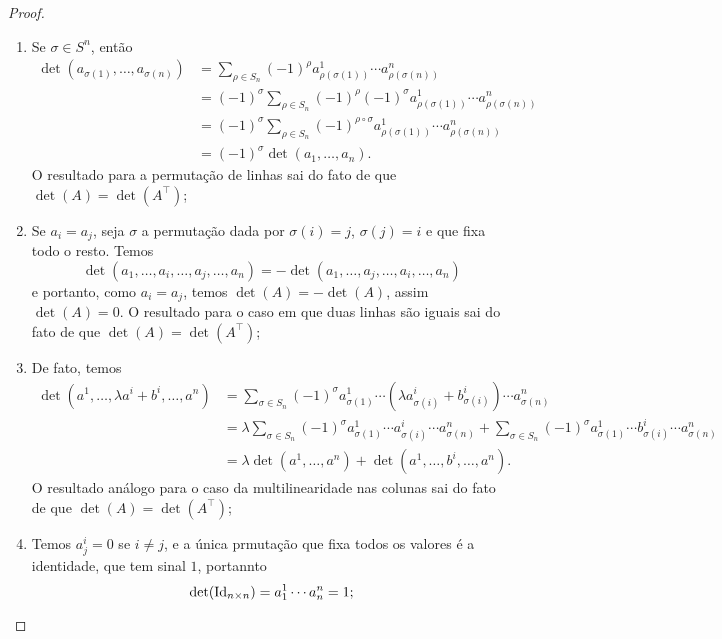 \begin{proof}
    \begin{enumerate}
        \item Se $\sigma \in S^n$, então \begin{align}
            \det(a_{\sigma(1)}, \dots, a_{\sigma(n)}) &= \sum_{\rho \in S_n} (-1)^\rho a^1_{\rho(\sigma(1))} \cdots a^n_{\rho(\sigma(n))} \\ &= (-1)^\sigma \sum_{\rho \in S_n} (-1)^\rho (-1)^\sigma a^1_{\rho(\sigma(1))} \cdots a^n_{\rho(\sigma(n))} \\ &= (-1)^\sigma \sum_{\rho \in S_n} (-1)^{\rho \circ \sigma} a^1_{\rho(\sigma(1))} \cdots a^n_{\rho(\sigma(n))} \\ &= (-1)^{\sigma} \det(a_1, \dots, a_n).
        \end{align} O resultado para a permutação de linhas sai do fato de que $\det(A) = \det(A^\top)$;

        \item Se $a_i = a_j$, seja $\sigma$ a permutação dada por $\sigma(i) = j$, $\sigma(j) = i$ e que fixa todo o resto. Temos \begin{equation}
            \det(a_1, \dots, a_i, \dots, a_j, \dots, a_n) = -\det(a_1, \dots, a_j, \dots, a_i, \dots, a_n)
        \end{equation} e portanto, como $a_i = a_j$, temos $\det(A) = -\det(A)$, assim $\det(A) = 0$. O resultado para o caso em que duas linhas são iguais sai do fato de que $\det(A) = \det(A^\top)$;

        \item De fato, temos \begin{align}
            \det(a^1, \dots, \lambda a^i + b^i, \dots, a^n) &= \sum_{\sigma \in S_n} (-1)^\sigma a^1_{\sigma(1)} \cdots (\lambda a^i_{\sigma(i)} + b^i_{\sigma(i)}) \cdots a^n_{\sigma(n)} \\ &= \lambda \sum_{\sigma \in S_n} (-1)^\sigma a^1_{\sigma(1)} \cdots a^i_{\sigma(i)} \cdots a^n_{\sigma(n)} + \sum_{\sigma \in S_n} (-1)^\sigma a^1_{\sigma(1)} \cdots b^i_{\sigma(i)} \cdots a^n_{\sigma(n)} \\ &= \lambda \det(a^1, \dots, a^n) + \det(a^1, \dots, b^i, \dots, a^n).
        \end{align} O resultado análogo para o caso da multilinearidade nas colunas sai do fato de que $\det(A) = \det(A^\top)$;

        \item Temos $a^i_j = 0$ se $i \neq j$, e a única prmutação que fixa todos os valores é a identidade, que tem sinal $1$, portannto \begin{equation}
            \det(\operatorname{Id}_{n \times n}) = a^1_1 \cdots a^n_n = 1;
        \end{equation}


\end{enumerate}
\end{proof}
